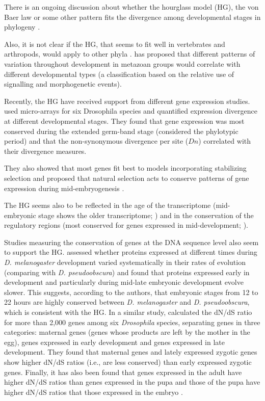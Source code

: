 There is an ongoing discussion about whether the hourglass model (HG), the von Baer law
or some other pattern fits the divergence among developmental stages in phylogeny \citep{Richardson1997,Poe2004,Kalinka2012}.

Also, it is not clear if the HG, that seems to fit well in vertebrates and arthropods, would apply to other phyla \citep{Raff1996} \citep{Salazar-Ciudad2010}.
\citet{Salazar-Ciudad2010} has proposed that different patterns of variation throughout development in metazoan groups would correlate with different developmental types (a classification based on the relative use of signalling and morphogenetic events).

Recently, the HG have received support from different gene expression studies.
\citet{Kalinka2010} used micro-arrays for six Drosophila species and quantified expression divergence at different developmental stages. They found that gene expression was most conserved during the extended germ-band stage (considered the phylotypic period) and that the non-synonymous divergence per site ($Dn$) correlated with their divergence measures.

They also showed that most genes fit best to models incorporating stabilizing selection and proposed that natural selection acts to conserve patterns of gene expression during mid-embryogenesis \citep{Kalinka2010}.

The HG seems also to be reflected in the age of the transcriptome (mid-embryonic stage shows the older transcriptome; \citealp{Domazet-Loso2010}) and in the conservation of the regulatory regions (most conserved for genes expressed in mid-development; \citealp{Piasecka2013}).

Studies measuring the conservation of genes at the DNA sequence level also seem to support the HG.
\citet{Davis2005} assessed whether proteins expressed at different times during \textit{D.  melanogaster} development varied systematically in their rates of evolution (comparing with \textit{D. pseudoobscura}) and found that proteins expressed early in development and particularly during mid-late embryonic development evolve slower.  
This suggests, according to the authors, that embryonic stages from 12 to 22 hours are
highly conserved between \textit{D. melanogaster} and \textit{D. pseudoobscura}, which is consistent with the HG.
%
In a similar study, \citet{Mensch2013} calculated the dN/dS ratio for more than 2,000 genes among six \textit{Drosophila} species, separating genes in three categories: maternal genes (genes whose products are left by the mother in the egg), genes expressed in early development and genes expressed in late development. They found that maternal genes and lately expressed zygotic genes show higher dN/dS ratios (i.e., are less conserved) than early expressed zygotic genes.
Finally, it has also been found that genes expressed in the adult have higher dN/dS ratios than genes expressed in the pupa and those of the pupa have higher dN/dS ratios that those expressed in the embryo \citep{Artieri2009}.

